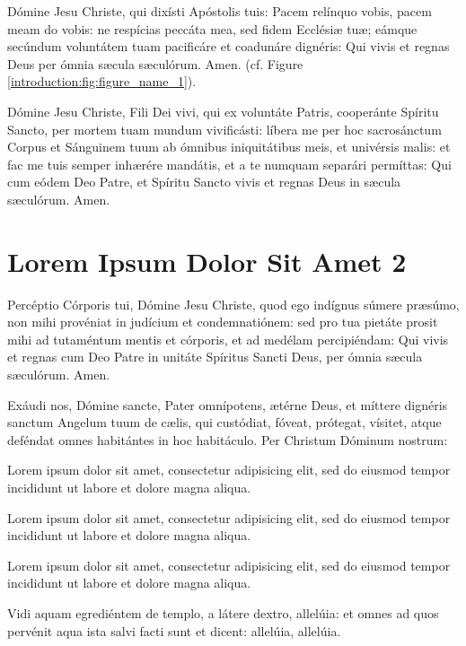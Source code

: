 Dómine Jesu Christe, qui dixísti Apóstolis tuis: Pacem relínquo vobis, pacem meam do vobis: ne respícias peccáta mea, sed fidem Ecclésiæ tuæ; eámque secúndum voluntátem tuam pacificáre et coadunáre dignéris: Qui vivis et regnas Deus per ómnia sæcula sæculórum. Amen. (cf. Figure \ref{introduction:fig:figure_name_1}).

Dómine Jesu Christe, Fili Dei vivi, qui ex voluntáte Patris, cooperánte Spíritu Sancto, per mortem tuam mundum vivificásti: líbera me per hoc sacrosánctum Corpus et Sánguinem tuum ab ómnibus iniquitátibus meis, et univérsis malis: et fac me tuis semper inhærére mandátis, et a te numquam separári permíttas: Qui cum eódem Deo Patre, et Spíritu Sancto vivis et regnas Deus in sæcula sæculórum. Amen.

\section{Lorem Ipsum Dolor Sit Amet 2}\label{introduction:sec:section_name_2}

Percéptio Córporis tui, Dómine Jesu Christe, quod ego indígnus súmere præsúmo, non mihi provéniat in judícium et condemnatiónem: sed pro tua pietáte prosit mihi ad tutaméntum mentis et córporis, et ad medélam percipiéndam: Qui vivis et regnas cum Deo Patre in unitáte Spíritus Sancti Deus, per ómnia sæcula sæculórum. Amen.

Exáudi nos, Dómine sancte, Pater omnípotens, ætérne Deus, et míttere dignéris sanctum Angelum tuum de cælis, qui custódiat, fóveat, prótegat, vísitet, atque deféndat omnes habitántes in hoc habitáculo. Per Christum Dóminum nostrum:
\begin{resques}\label{introduction:sec:section_name_2:resques_1}
Lorem ipsum dolor sit amet, consectetur adipisicing elit, sed do eiusmod tempor incididunt ut labore et dolore magna aliqua.
\end{resques}
\begin{resques}\label{introduction:sec:section_name_2:resques_2}
Lorem ipsum dolor sit amet, consectetur adipisicing elit, sed do eiusmod tempor incididunt ut labore et dolore magna aliqua.
\end{resques}
\begin{resques}\label{introduction:sec:section_name_2:resques_3}
Lorem ipsum dolor sit amet, consectetur adipisicing elit, sed do eiusmod tempor incididunt ut labore et dolore magna aliqua.
\end{resques}

Vidi aquam egrediéntem de templo, a látere dextro, allelúia: et omnes ad quos pervénit aqua ista salvi facti sunt et dicent: allelúia, allelúia.

